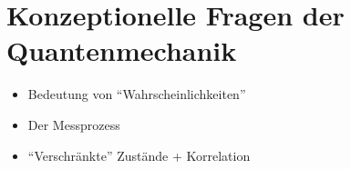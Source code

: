 \documentclass[ngerman, paper=a4, 12pt]{scrartcl}
\begin{document}
\tableofcontents
\newpage
\setcounter{section}{-1}
	
%	
%	
%	
%	
%	
%	
%	
%	
%	
%	
%	
%	 
%	
%	
%	
%	
%	 
%	
%	
%	
%	
%	
%	
%	
%	
%	
%	
%	
%	
%	
%	
%	
	\section{Konzeptionelle Fragen der Quantenmechanik} 
	\begin{itemize}
		\item Bedeutung von ``Wahrscheinlichkeiten''
		\item Der Messprozess
		\item ``Verschränkte'' Zustände + Korrelation
	\end{itemize}
	
	
	
\end{document}
